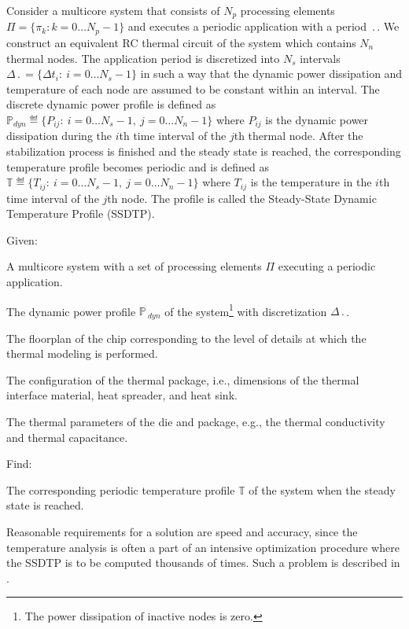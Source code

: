 Consider a multicore system that consists of $N_p$ processing elements $\Pi = \{ \pi_k: k = 0 \dots N_p - 1 \}$ and executes a periodic application with a period $\period$. We construct an equivalent RC thermal circuit of the system which contains $N_n$ thermal nodes. The application period is discretized into $N_s$ intervals $\Delta \period = \{ \Delta t_i: \: i = 0 \dots N_s - 1 \}$ in such a way that the dynamic power dissipation and temperature of each node are assumed to be constant within an interval. The discrete dynamic power profile is defined as $\mathbb{P}_{dyn} \eqdef \{ P_{ij}: \: i = 0 \dots N_s - 1, \: j = 0 \dots N_n - 1 \}$ where $P_{ij}$ is the dynamic power dissipation during the $i$th time interval of the $j$th thermal node. After the stabilization process is finished and the steady state is reached, the corresponding temperature profile becomes periodic and is defined as $\mathbb{T} \eqdef \{ T_{ij}: \: i = 0 \dots N_s - 1, \: j = 0 \dots N_n - 1 \}$ where $T_{ij}$ is the temperature in the $i$th time interval of the $j$th node. The profile is called the Steady-State Dynamic Temperature Profile (SSDTP).

Given:
\begin{ilist}
  \item A multicore system with a set of processing elements $\Pi$ executing a periodic application.
  \item The dynamic power profile $\mathbb{P}_{\:dyn}$ of the system\footnote{The power dissipation of inactive nodes is zero.} with discretization $\Delta \period$.
  \item The floorplan of the chip corresponding to the level of details at which the thermal modeling is performed.
  \item The configuration of the thermal package, i.e., dimensions of the thermal interface material, heat spreader, and heat sink.
  \item The thermal parameters of the die and package, e.g., the thermal conductivity and thermal capacitance.
\end{ilist}

Find:
\begin{ilist}
  \item The corresponding periodic temperature profile $\mathbb{T}$ of the system when the steady state is reached.
\end{ilist}

Reasonable requirements for a solution are speed and accuracy, since the temperature analysis is often a part of an intensive optimization procedure where the SSDTP is to be computed thousands of times. Such a problem is described in .
